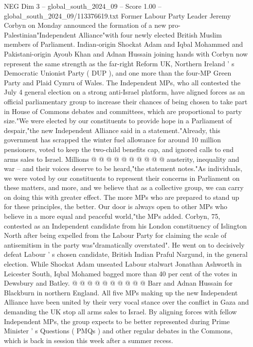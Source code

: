 \begin{textsample}{NEG Dim 3 – global\_south\_2024\_09 – Score 1.00 – global\_south\_2024\_09/113376619.txt}  \label{ex:f3_neg_136}
Former Labour Party Leader Jeremy Corbyn on Monday announced the formation of a new pro-Palestinian"Independent Alliance"with four newly elected British Muslim members of Parliament.
Indian-origin Shockat Adam and Iqbal Mohammed and Pakistani-origin Ayoub Khan and Adnan Hussain joining hands with Corbyn now represent the same strength as the far-right Reform UK, Northern Ireland ' s Democratic Unionist Party ( DUP ), and one more than the four-MP Green Party and Plaid Cymru of Wales.
The Independent MPs, who all contested the July 4 general election on a strong anti-Israel platform, have aligned forces as an official parliamentary group to increase their chances of being chosen to take part in House of Commons debates and committees, which are proportional to party size."We were elected by our constituents to provide hope in a Parliament of despair,"the new Independent Alliance said in a statement."Already, this government has scrapped the winter fuel allowance for around 10 million pensioners, voted to keep the two-child benefits cap, and ignored calls to end arms sales to Israel.
Millions @ @ @ @ @ @ @ @ @ @ austerity, inequality and war -- and their voices deserve to be heard,"the statement notes."As individuals, we were voted by our constituents to represent their concerns in Parliament on these matters, and more, and we believe that as a collective group, we can carry on doing this with greater effect.
The more MPs who are prepared to stand up for these principles, the better.
Our door is always open to other MPs who believe in a more equal and peaceful world,"the MPs added.
Corbyn, 75, contested as an Independent candidate from his London constituency of Islington North after being expelled from the Labour Party for claiming the scale of antisemitism in the party was"dramatically overstated".
He went on to decisively defeat Labour ' s chosen candidate, British Indian Praful Nargund, in the general election.
While Shockat Adam unseated Labour stalwart Jonathan Ashworth in Leicester South, Iqbal Mohamed bagged more than 40 per cent of the votes in Dewsbury and Batley. @ @ @ @ @ @ @ @ @ @ Barr and Adnan Hussain for Blackburn in northern England.
All five MPs making up the new Independent Alliance have been united by their very vocal stance over the conflict in Gaza and demanding the UK stop all arms sales to Israel.
By aligning forces with fellow Independent MPs, the group expects to be better represented during Prime Minister ' s Questions ( PMQs ) and other regular debates in the Commons, which is back in session this week after a summer recess.

\end{textsample}
